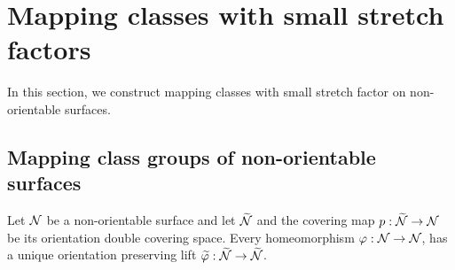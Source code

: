 \section{Mapping classes with small stretch factors}
\label{sec:mapping-classes-with}

In this section, we construct mapping classes with small stretch factor on non-orientable surfaces.

\subsection{Mapping class groups of non-orientable surfaces}
\label{sec:backgr-mapp-class}
Let $\mathcal{N}$ be a non-orientable surface and let $\widetilde{\mathcal{N}}$ and the covering map $p:\widetilde{\mathcal{N}}\rightarrow \mathcal{N}$ be its orientation double covering space.  
Every homeomorphism $\varphi: \mathcal{N} \to \mathcal{N}$, has a unique orientation preserving lift $\widetilde{\varphi}: \widetilde{\mathcal{N}} \to \widetilde{\mathcal{N}}$.


